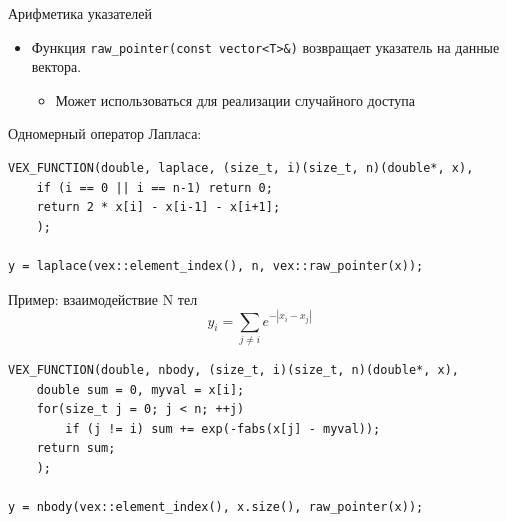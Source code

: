 \documentclass[@BEAMER_OPTIONS@]{beamer}
\newcommand{\code}[1]{\lstinline|#1|}
\newcommand{\singledevice}{\ribbon{east}{chameleon3}{1xGPU}}
\begin{document}

\begin{frame}[fragile]{Арифметика указателей} \singledevice
    \begin{itemize}
        \item Функция \code{raw_pointer(const vector<T>&)} возвращает указатель
            на данные вектора.
            \begin{itemize}
                \item Может использоваться для реализации случайного доступа
            \end{itemize}
    \end{itemize}
    \begin{exampleblock}{Одномерный оператор Лапласа:}
        \begin{lstlisting}
VEX_FUNCTION(double, laplace, (size_t, i)(size_t, n)(double*, x),
    if (i == 0 || i == n-1) return 0;
    return 2 * x[i] - x[i-1] - x[i+1];
    );

y = laplace(vex::element_index(), n, vex::raw_pointer(x));
        \end{lstlisting}
    \end{exampleblock}
\end{frame}

\note{ }

\begin{frame}[fragile]{Пример: взаимодействие N тел}
    \begin{equation*}
        y_i = \sum_{j \neq i} e^{-|x_i - x_j|}
    \end{equation*}
    \begin{exampleblock}{}
        \begin{lstlisting}
VEX_FUNCTION(double, nbody, (size_t, i)(size_t, n)(double*, x),
    double sum = 0, myval = x[i];
    for(size_t j = 0; j < n; ++j)
        if (j != i) sum += exp(-fabs(x[j] - myval));
    return sum;
    );

y = nbody(vex::element_index(), x.size(), raw_pointer(x));
        \end{lstlisting}
    \end{exampleblock}
\end{frame}
\end{document}
